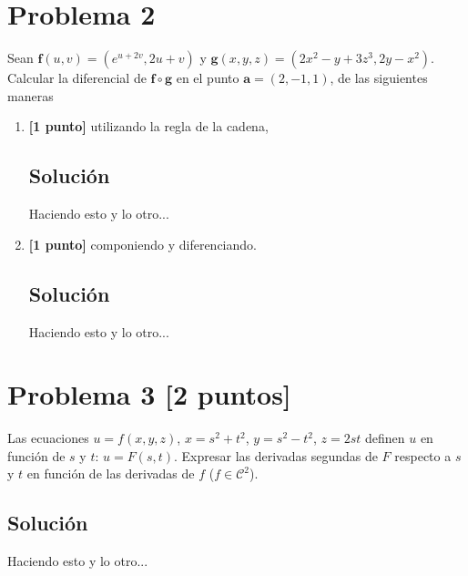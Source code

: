 \documentclass[12pt,a4paper,reqno]{article}
\newcommand{\cC}{\mathcal{C}}
\begin{document}
	\section{Problema 2}
	Sean $\bm f(u,v)=\left(e^{u+2v},2u+v\right)$ y $\bm g(x,y,z)=\left(2x^2-y+3z^3,2y-x^2\right)$. Calcular la diferencial de $\bm f\circ\bm g$ en el punto $\bm a=(2,-1,1)$, de las siguientes maneras
	\begin{enumerate}[label={(\alph*)}]
		\item \textbf{[1 punto]} utilizando la regla de la cadena,
		
		\subsection*{Solución}
		Haciendo esto y lo otro...
		
		\item \textbf{[1 punto]} componiendo y diferenciando.
		
		\subsection*{Solución}
		Haciendo esto y lo otro...
		
	\end{enumerate}
	
	\section{Problema 3 [2 puntos]}
	Las ecuaciones $u=f(x,y,z)$, $x=s^2+t^2$, $y=s^2-t^2$, $z=2st$ definen $u$ en función de $s$ y $t$: $u=F(s,t)$. Expresar las derivadas segundas de $F$ respecto a $s$ y $t$ en función de las derivadas de $f$ ($f\in\cC^2$).
	
	\subsection*{Solución}
	Haciendo esto y lo otro...
	
	
	
	
	
	
	
	
	
	
	
	
	
	
	
	
	
	
	
	
	
	
	
	
	
	
	
	
	
	
	
	
	
\end{document}
